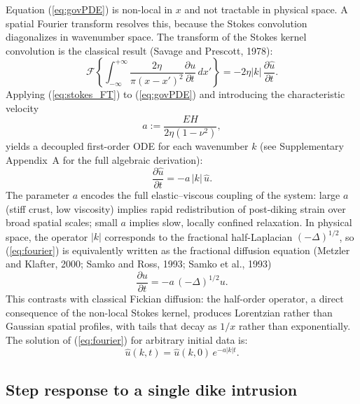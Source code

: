 \documentclass[12pt]{article}
\begin{document}
Equation (\ref{eq:govPDE}) is non-local in $x$ and not tractable in physical
space. A spatial Fourier transform resolves this, because the Stokes convolution
diagonalizes in wavenumber space. The transform of the Stokes kernel convolution
is the classical result (Savage and Prescott, 1978):
\begin{equation}
\mathcal{F}\!\left\{
  \int_{-\infty}^{+\infty}\frac{2\eta}{\pi(x-x')^2}
  \frac{\partial u}{\partial t}\,dx'
\right\} = -2\eta|k|\,\frac{\partial\hat{u}}{\partial t}.
\label{eq:stokes_FT}
\end{equation}
Applying (\ref{eq:stokes_FT}) to (\ref{eq:govPDE}) and introducing the
characteristic velocity
\begin{equation}
\boxed{a := \frac{EH}{2\eta(1-\nu^2)}},
\label{eq:a}
\end{equation}
yields a decoupled first-order ODE for each wavenumber $k$ (see
Supplementary Appendix~A for the full algebraic derivation):
\begin{equation}
\frac{\partial\hat{u}}{\partial t} = -a\,|k|\,\hat{u}.
\label{eq:fourier}
\end{equation}
The parameter $a$ encodes the full elastic--viscous coupling of the system:
large $a$ (stiff crust, low viscosity) implies rapid redistribution of
post-diking strain over broad spatial scales; small $a$ implies slow, locally
confined relaxation. In physical space, the operator $|k|$ corresponds to the
fractional half-Laplacian $(-\Delta)^{1/2}$, so (\ref{eq:fourier}) is
equivalently written as the fractional diffusion equation
(Metzler and Klafter, 2000; Samko and Ross, 1993; Samko et al., 1993)
\begin{equation}
\frac{\partial u}{\partial t} = -a\,(-\Delta)^{1/2}u.
\label{eq:fractional}
\end{equation}
This contrasts with classical Fickian diffusion: the half-order operator, a
direct consequence of the non-local Stokes kernel, produces Lorentzian rather
than Gaussian spatial profiles, with tails that decay as $1/x$ rather than
exponentially. The solution of (\ref{eq:fourier}) for arbitrary initial data is:
\begin{equation}
\hat{u}(k,t) = \hat{u}(k,0)\,e^{-a|k|t}.
\label{eq:fourier_sol}
\end{equation}

\subsection{Step response to a single dike intrusion}
\label{sec:step}
\end{document}

